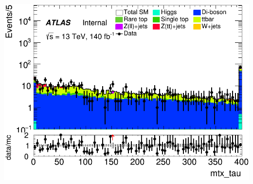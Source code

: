 \documentclass[usenames,dvipsnames]{beamer}
\begin{document}
\begin{frame}
\begin{minipage}{0.32\textwidth}
        \includegraphics[width=\textwidth]{graphics/LLH_met/LLH_met_mtx_tau.png}
    \end{minipage}
\end{frame}
\end{document}
